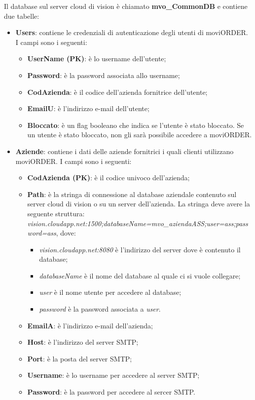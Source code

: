 Il database sul server cloud di vision è chiamato \textbf{mvo_CommonDB} e contiene due tabelle:
\begin{itemize}
	\item \textbf{Users}: contiene le credenziali di autenticazione degli utenti di moviORDER. I campi sono i seguenti:
		\begin{itemize}
			\item \textbf{UserName (PK)}: è lo username dell'utente;
			\item \textbf{Password}: è la password associata allo username;
			\item \textbf{CodAzienda}: è il codice dell'azienda fornitrice dell'utente;
			\item \textbf{EmailU}: è l'indirizzo e-mail dell'utente;
			\item \textbf{Bloccato}: è un flag booleano che indica se l'utente è stato bloccato. Se un utente è stato bloccato, non gli sarà possibile accedere a moviORDER.
		\end{itemize}
	\item \textbf{Aziende}: contiene i dati delle aziende fornitrici i quali clienti utilizzano moviORDER. I campi sono i seguenti:
		\begin{itemize}
			\item \textbf{CodAzienda (PK)}: è il codice univoco dell'azienda;
			\item \textbf{Path}: è la stringa di connessione al database aziendale contenuto sul server cloud di vision o su un server dell'azienda. La stringa deve avere la seguente struttura: \textit{vision.cloudapp.net:1500;databaseName=mvo_aziendaASS;user=ass;password=ass}, dove:
				\begin{itemize}
					\item \textit{vision.cloudapp.net:8080} è l'indirizzo del server dove è contenuto il database;
					\item \textit{databaseName} è il nome del database al quale ci si vuole collegare;
					\item \textit{user} è il nome utente per accedere al database;
					\item \textit{password} è la password associata a \textit{user}.
				\end{itemize}
			\item \textbf{EmailA}: è l'indirizzo e-mail dell'azienda;
			\item \textbf{Host}: è l'indirizzo del server SMTP;
			\item \textbf{Port}: è la posta del server SMTP;
			\item \textbf{Username}: è lo username per accedere al server SMTP;
			\item \textbf{Password}: è la password per accedere al sercer SMTP.
		\end{itemize}
\end{itemize}

